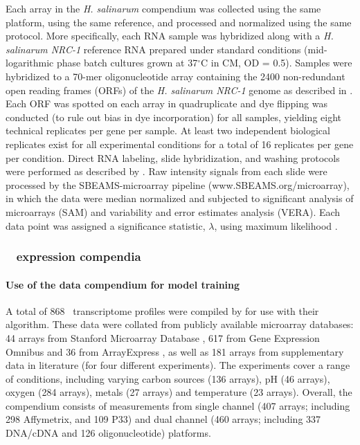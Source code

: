 Each array in the {\it H. salinarum} compendium was collected using
the same platform, using the same reference, and processed and
normalized using the same protocol. More specifically, each RNA sample
was hybridized along with a {\it H. salinarum NRC-1} reference RNA
prepared under standard conditions (mid-logarithmic phase batch
cultures grown at 37$^{\circ}$C in CM, OD = 0.5). Samples were hybridized to a
70-mer oligonucleotide array containing the 2400 non-redundant open
reading frames (ORFs) of the {\it H. salinarum NRC-1} genome as
described in \cite{Baliga2004a}. Each ORF was spotted on each array
in quadruplicate and dye flipping was conducted (to rule out bias in
dye incorporation) for all samples, yielding eight technical
replicates per gene per sample. At least two independent biological
replicates exist for all experimental conditions for a total of 16
replicates per gene per condition. Direct RNA labeling, slide
hybridization, and washing protocols were performed as described by
\cite{Facciotti2007,Schmid2007}. Raw intensity signals
from each slide were processed by the SBEAMS-microarray pipeline
\cite{Marzolf2006a} (www.SBEAMS.org/microarray), in which the
data were median normalized and subjected to significant analysis of
microarrays (SAM) and variability and error estimates analysis
(VERA). Each data point was assigned a significance statistic,
$\lambda$, using maximum likelihood \cite{Ideker2000}.

\subsubsection{\eco~ expression compendia}\label{ecodata}

\paragraph{Use of the  data compendium for model training}

A total of 868 \eco\ transcriptome profiles were compiled by
\cite{Lemmens2009a} for use with their  algorithm. 
These data were collated from publicly available microarray databases:
44 arrays from Stanford Microarray Database \cite{Demeter2007d},
617 from Gene Expression Omnibus \cite{Barrett2007} and 36 from
ArrayExpress \cite{Parkinson2007}, as well as 181 arrays from
supplementary data in literature (for four different experiments). The
experiments cover a range of conditions, including varying carbon
sources (136 arrays), pH (46 arrays), oxygen (284 arrays), metals (27
arrays) and temperature (23 arrays). Overall, the compendium consists
of measurements from single channel (407 arrays; including 298 Affymetrix, 
and 109 P33) and dual channel (460 arrays; including 337 DNA/cDNA
and 126 oligonucleotide) platforms.

